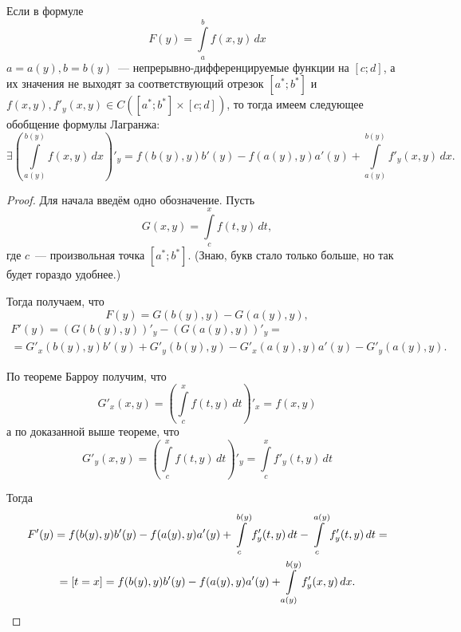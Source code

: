 \documentclass[../../main.tex]{subfiles}
\begin{document}
\begin{rem}
	Если в формуле
	\[F(y) = \int\limits_a^b f(x, y)\,dx\]
	$a = a(y), b = b(y)$~--- непрерывно-дифференцируемые функции на $[c; d]$,
	а их значения не выходят за соответствующий отрезок $[a^*;b^*]$ и $f(x, y),
	f'_y(x, y)\in C([a^*; b^*] \times [c; d])$, то тогда имеем следующее 
	обобщение формулы Лагранжа:
	\[\exists \left(\int\limits_{a(y)}^{b(y)} f(x, y)\,dx\right)'_y = 
	f(b(y), y)b'(y) - f(a(y), y)a'(y) + 
	\int\limits_{a(y)}^{b(y)}f'_y(x, y)\,dx.\]
\end{rem}

\begin{proof}
	Для начала введём одно обозначение. Пусть
	\[G(x, y) = \int\limits_c^x f(t, y)\,dt,\]
	где $c$~--- произвольная точка $[a^*;b^*]$. 
	(Знаю, букв стало только больше, но так будет гораздо удобнее.)
	
	Тогда получаем, что
	\[F(y) = G(b(y), y) - G(a(y), y),\]
	\begin{gather*}
		F'(y) = \left(G(b(y), y)\right)'_y -\left(G(a(y), y)\right)'_y =\\
		= G'_x(b(y), y)b'(y) + G'_y(b(y), y) - G'_x(a(y), y)a'(y) - 
		G'_y(a(y), y).
	\end{gather*}
	
	По теореме Барроу получим, что
	\[G'_x(x, y) = \left(\int\limits_c^x f(t, y)\,dt\right)'_x = f(x, y)\]
	а по доказанной выше теореме, что
	\[G'_y(x, y) = \left(\int\limits_c^x f(t, y)\,dt\right)'_y =
	\int\limits_c^x f'_y(t, y)\,dt\]
	
	Тогда
	\begin{gather*}
		F'(y) = f(b(y), y)b'(y) - f(a(y), y)a'(y) + 
		\int\limits_c^{b(y)} f'_y(t, y)\,dt - 
		\int\limits_c^{a(y)} f'_y(t, y)\,dt =\\=[t = x]
		= f(b(y), y)b'(y) - f(a(y), y)a'(y) + 
		\int\limits_{a(y)}^{b(y)} f'_y(x, y)\,dx. \qedhere
	\end{gather*}
\end{proof}
\end{document}
